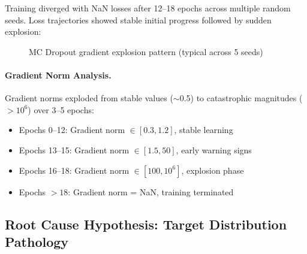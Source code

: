 Training diverged with NaN losses after 12--18 epochs across multiple random seeds. Loss trajectories showed stable initial progress followed by sudden explosion:

\begin{figure}[!ht]
\centering
\caption{MC Dropout gradient explosion pattern (typical across 5 seeds)}
\label{fig:mc-dropout-explosion}
\end{figure}

\paragraph{Gradient Norm Analysis.}
Gradient norms exploded from stable values ($\sim$0.5) to catastrophic magnitudes ($>10^6$) over 3--5 epochs:

\begin{itemize}
  \item Epochs 0--12: Gradient norm $\in [0.3, 1.2]$, stable learning
  \item Epochs 13--15: Gradient norm $\in [1.5, 50]$, early warning signs
  \item Epochs 16--18: Gradient norm $\in [100, 10^{6}]$, explosion phase
  \item Epochs ${>}18$: Gradient norm = NaN, training terminated
\end{itemize}

\subsection{Root Cause Hypothesis: Target Distribution Pathology}

